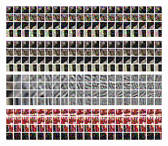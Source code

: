 \documentclass[10pt, journal, twocolumn, final, a4paper]{IEEEtran}
\begin{document}
\begin{figure}[htpb!]
	\centering
	\includegraphics[width = \columnwidth]{figs/patch_groups/patch_group_bus_045_085_012_s40_wx37_wt2_sx9_st4_r040_n200_nisy.png}\\
	\vspace{.2cm}
	\includegraphics[width = \columnwidth]{figs/patch_groups/patch_group_bus_045_085_012_s40_wx37_wt2_sx9_st4_r040_n200_deno.png}\\
	\vspace{.2cm}
	\includegraphics[width = \columnwidth]{figs/patch_groups/patch_group_bus_045_085_012_s40_wx37_wt2_sx9_st4_r040_n200_pcas.png}\\
	\vspace{.2cm}
	\includegraphics[width = \columnwidth]{figs/patch_groups/patch_group_bus_255_056_010_s40_wx37_wt2_sx9_st4_r040_n200_nisy.png}\\
	\vspace{.2cm}

\end{figure}
\end{document}
